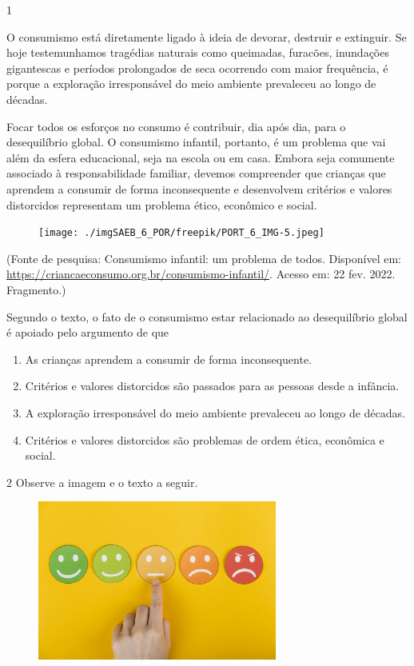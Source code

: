 \num{1}

O consumismo está diretamente ligado à ideia de devorar, destruir e
extinguir. Se hoje testemunhamos tragédias naturais como queimadas,
furacões, inundações gigantescas e períodos prolongados de seca
ocorrendo com maior frequência, é porque a exploração irresponsável do
meio ambiente prevaleceu ao longo de décadas.

Focar todos os esforços no consumo é contribuir, dia após dia, para o
desequilíbrio global. O consumismo infantil, portanto, é um problema que
vai além da esfera educacional, seja na escola ou em casa. Embora seja
comumente associado à responsabilidade familiar, devemos compreender que
crianças que aprendem a consumir de forma inconsequente e desenvolvem
critérios e valores distorcidos representam um problema ético, econômico
e social.


\begin{figure}
\texttt{[image: ./imgSAEB\_6\_POR/freepik/PORT\_6\_IMG-5.jpeg]}
\end{figure}

(Fonte de pesquisa: Consumismo infantil: um problema de todos.
Disponível em: 
\url{https://criancaeconsumo.org.br/consumismo-infantil/}.
Acesso em: 22 fev. 2022. Fragmento.)

Segundo o texto, o fato de o consumismo estar relacionado ao
desequilíbrio global é apoiado pelo argumento de que

\begin{enumerate}
\def\labelenumi{\alph{enumi})}
\item As crianças aprendem a consumir de forma inconsequente.
\item Critérios e valores distorcidos são passados para as pessoas desde a
infância.
\item A exploração irresponsável do meio ambiente prevaleceu ao longo de
décadas.
\item Critérios e valores distorcidos são problemas de ordem ética,
econômica e social.
\end{enumerate}

\num{2} Observe a imagem e o texto a seguir.

\begin{figure}
\includegraphics[width=0.7\textwidth]{./imgSAEB_6_POR/freepik/PORT_6_IMG-6.jpeg}
\end{figure}

